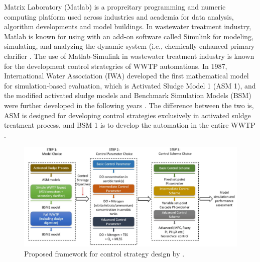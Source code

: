 Matrix Laboratory (Matlab) is a propreitary programming and numeric computing platform used across industries and academia for data analysis, algorithm developments and model buildings. In wastewater treatment industry, Matlab is known for using with an add-on software called Simulink for modeling, simulating, and analyzing the dynamic system (i.e., chemically enhanced primary clarifier \citep{bachisModellingCharacterizationPrimary2015}. The use of Matlab-Simulink in wastewater treatment industry is known for the development control strategries of WWTP automations. In 1987, International Water Association (IWA) developed the first mathematical model for simulation-based evaluation, which is Activated Sludge Model 1 (ASM 1), and the modified activated sludge models and Benchmark Simulation Models (BSM) were further developed in the following years \citep{talibModelingControlWastewater2011}. The difference between the two is, ASM is designed for developing control strategies exclusively in activated suldge treatment process, and BSM 1 is to develop the automation in the entire WWTP \citep{ballhysaWastewaterTreatmentPlant2020}.

\begin{figure}[h]
   \centering
   \includegraphics[width=0.9\columnwidth]{imgs/propose-frameworks-for-control-strategy-design.png}
   \caption{Proposed framework for control strategy design by \citet{ballhysaWastewaterTreatmentPlant2020}.}
   \label{fig:control-strategy-design}
\end{figure}
 
